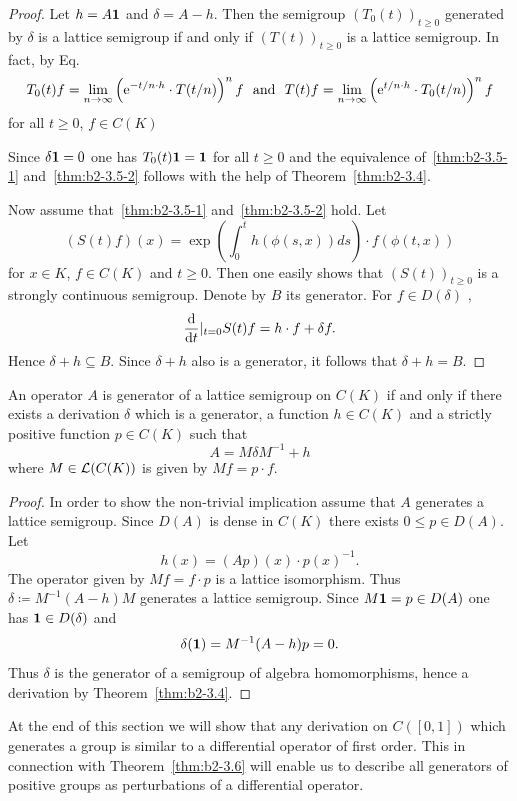 \begin{proof}
Let $h = A\mathbf{1}$ and $\delta = A - h$.
Then the semigroup $(T_{0}(t))_{t \geq 0}$ generated by $\delta$ is a lattice semigroup if and only if\/ $(T(t))_{t \geq 0}$ is a lattice semigroup. In fact, by 
Eq.~ %
\[
T_{0}(t)f = \lim_{n \to \infty} \left(\mathrm{e}^{-t/n \cdot h} \cdot T(t/n)\right)^{n}f 
\ \text{ and }\  
 T(t)f = \lim_{n \to \infty} \left(\mathrm{e}^{{t/n} \cdot h} \cdot T_{0}(t/n)\right)^{n}f
\]
 for all $t \geq 0$, $f \in C(K)$

Since $\delta \mathbf{1} = 0$ one has $T_{0}(t)\mathbf{1} = \mathbf{1}$ for all $t \geq 0$ and the equivalence of~\ref{thm:b2-3.5-1} and~\ref{thm:b2-3.5-2} follows with the help of Theorem~\ref{thm:b2-3.4}.

Now assume that~\ref{thm:b2-3.5-1} and~\ref{thm:b2-3.5-2} hold.
Let
\[
(S(t)f) (x) = \exp\left( \int_{0}^{t} h(\phi(s,x))ds \right) \cdot f(\phi(t,x))
\]
for $x \in K$, $f \in C (K)$ and $t \geq 0$. 
Then one easily shows that $(S(t))_{t\geq 0}$ is a strongly con\-tinu\-ous semigroup.
Denote by $B$ its generator.
For $f \in D(\delta)$ , 
%
\[
	 \frac{\mathop{}\!\mathrm{d}{}}{\mathop{}\!\mathrm{d}{t}}|_{t = 0}S(t)f = h \cdot f + \delta f .
\]
%
Hence $\delta + h \subseteq B$.  
Since $\delta + h$ also is a generator, it follows that $\delta + h = B$.
\end{proof}%
\begin{theorem}\label{thm:b2-3.6}
An operator $A$ is generator of a lattice semigroup on $C(K)$ if and only if there exists a derivation $\delta$ which is a generator, a function $h \in C(K)$ and a strictly positive function $p \in C(K)$ such that
\begin{equation} \label{eq:b2-3.7}
A = M\delta M^{-1} + h
\end{equation}
where $M \in \mathcal{L}(C(K))$ is given by $Mf = p \cdot f$.
\end{theorem}
\begin{proof}
In order to show the non-trivial implication assume that $A$ generates a lattice semigroup.
Since $D(A)$ is dense in $C(K)$ there exists $0 \leq  p \in D(A)$.
Let 
%
\[
	h(x) = (Ap)(x) \cdot p(x)^{-1}.
\]
%
The operator given by $Mf = f \cdot p$ is a lattice isomorphism.
Thus $\delta \coloneq M^{-1}(A - h)M$ generates a lattice semigroup.
Since $M\mathbf{1} = p \in D(A)$ one has $\mathbf{1} \in D(\delta)$ and %
\[
	\delta(\mathbf{1}) = M^{-1}(A - h)p = 0.
\]
%
Thus $\delta$ is the generator of a semigroup of algebra homomorphisms, hence a derivation by Theorem~\ref{thm:b2-3.4}.
\end{proof}
At the end of this section we will show that any derivation on $C([0,1])$ which generates a group is similar to a differential operator of first order.
This in connection with Theorem~\ref{thm:b2-3.6} will enable us to describe all generators of positive groups as perturbations of a differential operator.

